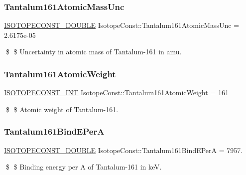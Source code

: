 \subsubsection{\texorpdfstring{Tantalum161\+Atomic\+Mass\+Unc}{Tantalum161AtomicMassUnc}}
{\footnotesize\ttfamily \mbox{\hyperlink{group___isotope_const-_macros_ga8f45a7272ce02c0b4c65c44636ed719a}{I\+S\+O\+T\+O\+P\+E\+C\+O\+N\+S\+T\+\_\+\+D\+O\+U\+B\+LE}} Isotope\+Const\+::\+Tantalum161\+Atomic\+Mass\+Unc = 2.\+6175e-\/05}

\$ \$ Uncertainty in atomic mass of Tantalum-\/161 in amu. \mbox{\label{group___isotope_const-_tantalum-_ta161_ga3b02aef662c68ddd7432dc6cfef7a4c1}} 
\subsubsection{\texorpdfstring{Tantalum161\+Atomic\+Weight}{Tantalum161AtomicWeight}}
{\footnotesize\ttfamily \mbox{\hyperlink{group___isotope_const-_macros_ga5f18360b3e99483a35c32d789e62621c}{I\+S\+O\+T\+O\+P\+E\+C\+O\+N\+S\+T\+\_\+\+I\+NT}} Isotope\+Const\+::\+Tantalum161\+Atomic\+Weight = 161}

\$ \$ Atomic weight of Tantalum-\/161. \mbox{\label{group___isotope_const-_tantalum-_ta161_ga04cc5b91d7b892b4039b4c9405dcbaac}} 
\subsubsection{\texorpdfstring{Tantalum161\+Bind\+E\+PerA}{Tantalum161BindEPerA}}
{\footnotesize\ttfamily \mbox{\hyperlink{group___isotope_const-_macros_ga8f45a7272ce02c0b4c65c44636ed719a}{I\+S\+O\+T\+O\+P\+E\+C\+O\+N\+S\+T\+\_\+\+D\+O\+U\+B\+LE}} Isotope\+Const\+::\+Tantalum161\+Bind\+E\+PerA = 7957.}

\$ \$ Binding energy per A of Tantalum-\/161 in keV. \mbox{\label{group___isotope_const-_tantalum-_ta161_ga4954b0a88c735718d32f08c50120e2c0}} 
